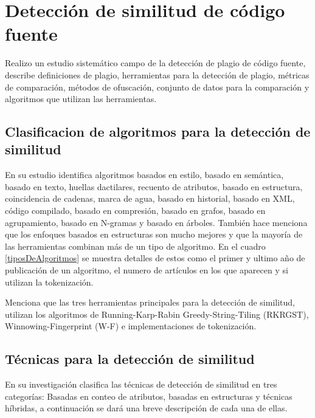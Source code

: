 \section{Detección de similitud de código fuente}
\cite{Novak2019} Realizo un estudio sistemático campo de la detección de plagio de código fuente, describe definiciones de plagio, herramientas para la detección de plagio, métricas de comparación, métodos de ofuscación, conjunto de datos para la comparación y algoritmos que utilizan las herramientas.
\subsection{Clasificacion de algoritmos para la detección de similitud}
En su estudio \cite{Novak2019} identifica algoritmos basados en estilo, basado en semántica, basado en texto, huellas dactilares, recuento de atributos, basado en estructura, coincidencia de cadenas, marca de agua, basado en historial, basado en XML, código compilado, basado en compresión, basado en grafos, basado en agrupamiento, basado en N-gramas y basado en árboles. También hace menciona que los enfoques basados en estructuras son mucho mejores y que la mayoría de las herramientas combinan más de un tipo de algoritmo. En el cuadro \ref{tiposDeAlgoritmos} se muestra detalles de estos como el primer y ultimo año de publicación de un algoritmo, el numero de artículos en los que aparecen y si utilizan la tokenización.



\cite{Novak2019} Menciona que las tres herramientas principales para la detección de similitud, utilizan los algoritmos de Running-Karp-Rabin Greedy-String-Tiling (RKRGST), Winnowing-Fingerprint (W-F) e implementaciones de tokenización.

\subsection{Técnicas para la detección de similitud}
En su investigación \cite{Karnalim2019} clasifica las técnicas de detección de similitud en tres categorías: Basadas en conteo de atributos, basadas en estructuras y técnicas híbridas, a continuación se dará una breve descripción de cada una de ellas.

